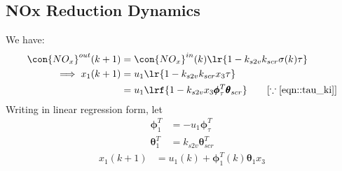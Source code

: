 \subsection{NOx Reduction Dynamics}
We have:
\begin{align*}
    \con{NO_x}^{out} (k + 1) &= \con{NO_x}^{in} (k) \lr{1 - k_{s2v} k_{scr} \sigma(k) \tau}\\
    \implies x_1 (k+1) &= u_1 \lr{1 - k_{s2v} k_{scr} x_3 \tau}\\
                       &= u_1 \lrf{1 - k_{s2v} x_3 \pmb \phi_\tau^T \pmb \theta_{scr}} \qquad [\because \ref{eqn::tau_ki}]
\end{align*}
Writing in linear regression form, let
\begin{align*}
    \pmb \phi_1^T &= -u_1 \pmb \phi_\tau^T  \\
    \pmb \theta_1^T &= k_{s2v} \pmb \theta_{scr}^T
\end{align*}
\begin{align}
    x_1(k+1) &= u_1(k) + \pmb \phi_1^T (k) \pmb \theta_1 x_3  \label{eqn::nox_regression}
\end{align}















